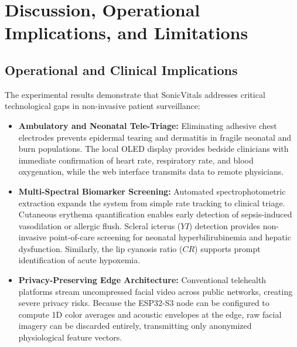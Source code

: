 \documentclass[journal]{IEEEtran}
\begin{document}
\section{Discussion, Operational Implications, and Limitations}
\label{sec:discussion}

\subsection{Operational and Clinical Implications}
The experimental results demonstrate that SonicVitals addresses critical technological gaps in non-invasive patient surveillance:
\begin{itemize}
  \item \textbf{Ambulatory and Neonatal Tele-Triage:} Eliminating adhesive chest electrodes prevents epidermal tearing and dermatitis in fragile neonatal and burn populations. The local OLED display provides bedside clinicians with immediate confirmation of heart rate, respiratory rate, and blood oxygenation, while the web interface transmits data to remote physicians.
  \item \textbf{Multi-Spectral Biomarker Screening:} Automated spectrophotometric extraction expands the system from simple rate tracking to clinical triage. Cutaneous erythema quantification enables early detection of sepsis-induced vasodilation or allergic flush. Scleral icterus ($YI$) detection provides non-invasive point-of-care screening for neonatal hyperbilirubinemia and hepatic dysfunction. Similarly, the lip cyanosis ratio ($CR$) supports prompt identification of acute hypoxemia.
  \item \textbf{Privacy-Preserving Edge Architecture:} Conventional telehealth platforms stream uncompressed facial video across public networks, creating severe privacy risks. Because the ESP32-S3 node can be configured to compute 1D color averages and acoustic envelopes at the edge, raw facial imagery can be discarded entirely, transmitting only anonymized physiological feature vectors.
\end{itemize}
\end{document}
